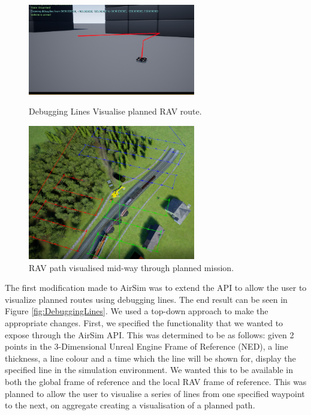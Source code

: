 \begin{figure}
    \centering
    \includegraphics[width=0.65\textwidth]{Chapters/SimulationEnv/Figs/DebuggingLines/DebugLines.png}
    \caption{Debugging Lines Visualise planned RAV route.}
    \label{fig:DebuggingLines}

    \centering
    \includegraphics[width=0.65\textwidth]{Chapters/SimulationEnv/Figs/DebuggingLines/RoutesWithRAVsVisible.png}
    \caption{RAV path visualised mid-way through planned mission.}
    \label{fig:DebuggingLinesPlannedMission}
\end{figure}
The first modification made to AirSim was to extend the API to allow the user to visualize planned routes using debugging lines. %
The end result can be seen in Figure \ref{fig:DebuggingLines}. We used a top-down approach to make the appropriate changes. First, we specified the functionality that we wanted to expose through the AirSim API. This was determined to be as follows: given 2 points in the 3-Dimensional Unreal Engine Frame of Reference (NED), a line thickness, a line colour and a time which the line will be shown for, display the specified line in the simulation environment. We wanted this to be available in both the global frame of reference and the local RAV frame of reference. This was planned to allow the user to visualise a series of lines from one specified waypoint to the next, on aggregate creating a visualisation of a planned path.
\newline


